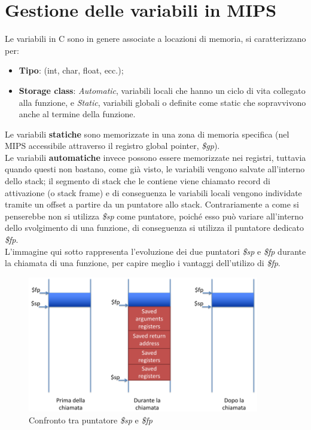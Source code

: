 \documentclass[class=book, crop=false]{standalone}
\begin{document}
\section{Gestione delle variabili in MIPS}
Le variabili in C sono in genere associate a locazioni di memoria, si caratterizzano per:
\begin{itemize}[noitemsep]
	\item \textbf{Tipo}: (int, char, float, ecc.);
	\item \textbf{Storage class}: \emph{Automatic}, variabili locali che hanno un ciclo di vita collegato alla funzione, e \emph{Static}, variabili globali o definite come static che sopravvivono anche al termine della funzione.
\end{itemize}
Le variabili \textbf{statiche} sono memorizzate in una zona di memoria specifica (nel MIPS accessibile attraverso il registro global pointer, \emph{\$gp}).\\
Le variabili \textbf{automatiche} invece possono essere memorizzate nei registri, tuttavia quando questi non bastano, come già visto, le variabili vengono salvate all'interno dello stack; il segmento di stack che le contiene viene chiamato record di attivazione (o stack frame) e di conseguenza le variabili locali vengono individate tramite un offset a partire da un puntatore allo stack.
Contrariamente a come si penserebbe non si utilizza \emph{\$sp} come puntatore, poiché esso può variare all'interno dello svolgimento di una funzione, di conseguenza si utilizza il puntatore dedicato \emph{\$fp}.\\
L'immagine qui sotto rappresenta l'evoluzione dei due puntatori \emph{\$sp} e \emph{\$fp} durante la chiamata di una funzione, per capire meglio i vantaggi dell'utilizo di \emph{\$fp}.
\begin{figure}[H]
	\centering
	\includegraphics[width=0.9\textwidth,keepaspectratio]{sp-vs-fp}
	\caption{Confronto tra puntatore \emph{\$sp} e \emph{\$fp}}
\end{figure}
\end{document}
